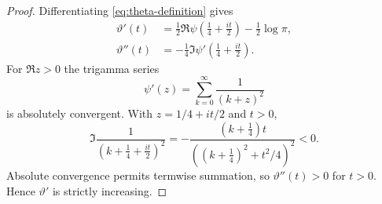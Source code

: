 \documentclass[11pt]{amsart}
\numberwithin{equation}{section}
\begin{document}
\begin{proof}
Differentiating \eqref{eq:theta-definition} gives
\begin{align}
 \vartheta'(t)
 &=\frac12\Re\psi\!\left(\frac14+\frac{it}{2}\right)
   -\frac12\log\pi,
 \label{eq:theta-digamma}\\
 \vartheta''(t)
 &=-\frac14\Im\psi'\!\left(\frac14+\frac{it}{2}\right).
 \label{eq:theta-trigamma}
\end{align}
For $\Re z>0$ the trigamma series
\begin{equation}
 \psi'(z)=\sum_{k=0}^{\infty}\frac1{(k+z)^2}
 \label{eq:trigamma-series}
\end{equation}
is absolutely convergent.  With $z=1/4+it/2$ and $t>0$,
\begin{equation}
 \Im\frac1{(k+\frac14+\frac{it}{2})^2}
 =-
 \frac{(k+\frac14)t}
 {((k+\frac14)^2+t^2/4)^2}<0.
 \label{eq:trigamma-imag-negative}
\end{equation}
Absolute convergence permits termwise summation, so
$\vartheta''(t)>0$ for $t>0$.  Hence $\vartheta'$ is strictly increasing.


\end{proof}
\end{document}
